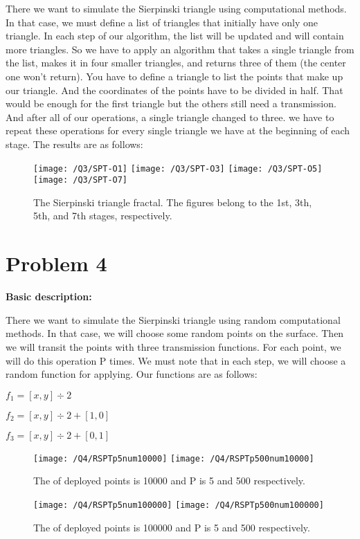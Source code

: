 \documentclass{article}
\begin{document}
    There we want to simulate the Sierpinski triangle using computational methods.
    In that case, we must define a list of triangles that initially have only one triangle.
    In each step of our algorithm, the list will be updated and will contain more triangles.
    So we have to apply an algorithm that takes a single triangle from the list,
    makes it in four smaller triangles, and returns three of them (the center one won't return).
    You have to define a triangle to list the points that make up our triangle.
    And the coordinates of the points have to be divided in half.
    That would be enough for the first triangle but the others still need a transmission.
    And after all of our operations, a single triangle changed to three.
    we have to repeat these operations for every single triangle we have at the beginning of each stage.
    The results are as follows:
    \begin{figure}[!htb]
        \centering
        \texttt{[image: /Q3/SPT-O1]}
        \label{fig:3.1.1}
        \texttt{[image: /Q3/SPT-O3]}
        \label{fig:3.1.2}
        \texttt{[image: /Q3/SPT-O5]}
        \label{fig:3.1.3}
        \texttt{[image: /Q3/SPT-O7]}
        \label{fig:3.1.3}
        \caption{The Sierpinski triangle fractal. The figures belong to the 1st, 3th, 5th, and 7th stages, respectively.}
    \end{figure}
    \section*{Problem 4}
    \textbf{Basic description:}

    There we want to simulate the Sierpinski triangle using random computational methods.
    In that case, we will choose some random points on the surface.
    Then we will transit the points with three transmission functions.
    For each point, we will do this operation P times.
    We must note that in each step,
    we will choose a random function for applying.
    Our functions are as follows:

    $f_{1} = [x, y] \div 2$

    $f_{2} = [x, y] \div 2 + [1, 0]$

    $f_{3} = [x, y] \div 2 + [0, 1]$

    \begin{figure}[!htb]
        \centering
        \texttt{[image: /Q4/RSPTp5num10000]}
        \label{fig:4.1.1}
        \texttt{[image: /Q4/RSPTp500num10000]}
        \label{fig:4.1.2}
        \caption{The of deployed points is 10000 and P is 5 and 500 respectively.}
    \end{figure}
    \begin{figure}[!htb]
        \centering
        \texttt{[image: /Q4/RSPTp5num100000]}
        \label{fig:4.2.1}
        \texttt{[image: /Q4/RSPTp500num100000]}
        \label{fig:4.2.2}
        \caption{The of deployed points is 100000 and P is 5 and 500 respectively.}
    \end{figure}
\end{document}
